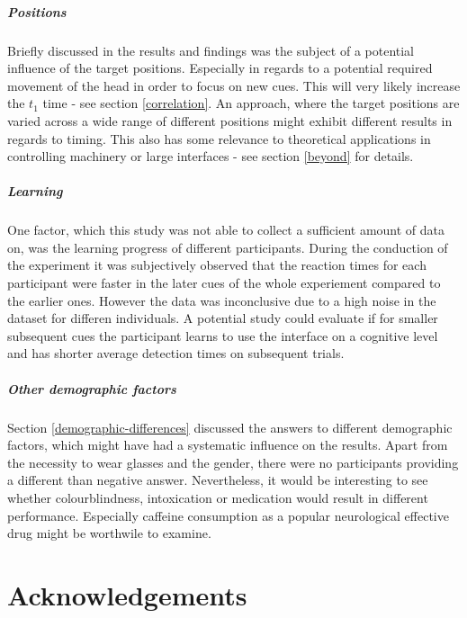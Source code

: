             \paragraph{Positions} Briefly discussed in the results and findings was the subject of a potential influence of the target positions. Especially in regards to a potential required movement of the head in order to focus on new cues. This will very likely increase the $t_{1}$ time - see section \ref*{correlation}. An approach, where the target positions are varied across a wide range of different positions might exhibit different results in regards to timing. This also has some relevance to theoretical applications in controlling machinery or large interfaces - see section \ref*{beyond} for details.

            \paragraph{Learning} One factor, which this study was not able to collect a sufficient amount of data on, was the learning progress of different participants. During the conduction of the experiment it was subjectively observed that the reaction times for each participant were faster in the later cues of the whole experiement compared to the earlier ones. However the data was inconclusive due to a high noise in the dataset for differen individuals. A potential study could evaluate if for smaller subsequent cues the participant learns to use the interface on a cognitive level and has shorter average detection times on subsequent trials.

            \paragraph{Other demographic factors} Section \ref*{demographic-differences} discussed the answers to different demographic factors, which might have had a systematic influence on the results. Apart from the necessity to wear glasses and the gender, there were no participants providing a different than negative answer. Nevertheless, it would be interesting to see whether colourblindness, intoxication or medication would result in different performance. Especially caffeine consumption as a popular neurological effective drug might be worthwile to examine. 

    \chapter{Acknowledgements}

